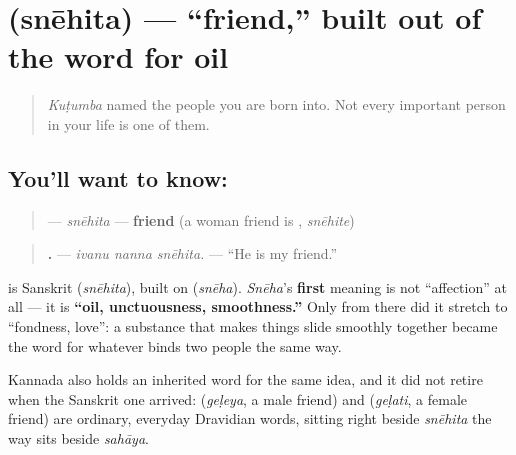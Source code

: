 \section[\texorpdfstring{\kn{ಸ್ನೇಹಿತ} (snēhita)}{ಸ್ನೇಹಿತ (snēhita)}]{ (snēhita) — \textquotedblleft{}friend,\textquotedblright{} built out of the word for oil}

\label{lesson:KA-C35-snehita}



\begin{quote}
\emph{Kuṭumba} named the people you are born into. Not every important person in your life is one of them.
\end{quote}

\subsection*{You'll want to know: }
\begin{quote}
\textbf{} — \emph{snēhita} — \textbf{friend} (a woman friend is \textbf{}, \emph{snēhite})
\end{quote}

\begin{quote}
\textbf{  .} — \emph{ivanu nanna snēhita.} — \textquotedblleft{}He is my friend.\textquotedblright{}
\end{quote}

\begin{cousinweb}
\textbf{} is Sanskrit \textbf{} (\emph{snēhita}), built on \textbf{} (\emph{snēha}). \emph{Snēha}'s \textbf{first} meaning is not \textquotedblleft{}affection\textquotedblright{} at all — it is \textbf{\textquotedblleft{}oil, unctuousness, smoothness.\textquotedblright{}} Only from there did it stretch to \textquotedblleft{}fondness, love\textquotedblright{}: a substance that makes things slide smoothly together became the word for whatever binds two people the same way.

Kannada also holds an inherited word for the same idea, and it did not retire when the Sanskrit one arrived: \textbf{} (\emph{geḷeya}, a male friend) and \textbf{} (\emph{geḷati}, a female friend) are ordinary, everyday Dravidian words, sitting right beside \emph{snēhita} the way \textbf{} sits beside \emph{sahāya}.
\end{cousinweb}

